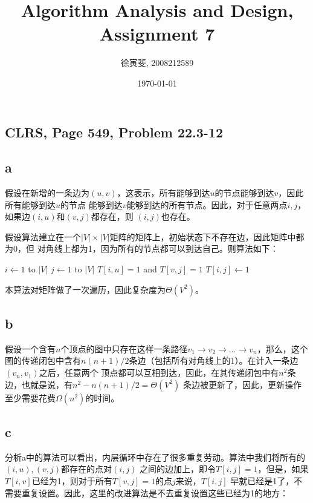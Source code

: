 \documentclass{article}
\begin{document}
\begin{CJK}{UTF8}{gbsn}
\title{Algorithm Analysis and Design, Assignment 7}
\author{徐寅斐, 2008212589}
\date{\today}

\maketitle

\section{CLRS, Page 549, Problem 22.3-12}

\subsection*{a}
假设在新增的一条边为$(u,v)$，这表示，所有能够到达$u$的节点能够到达$v$，因此所有能够到达$u$的节点
能够到达$v$能够到达的所有节点。因此，对于任意两点$i,j$，如果边$(i,u)$和$(v,j)$都存在，则
$(i,j)$也存在。

假设算法建立在一个$|V| \times |V| $矩阵的矩阵上，初始状态下不存在边，因此矩阵中都为0，但
对角线上都为1，因为所有的节点都可以到达自己。则算法如下：

\begin{codebox}
\li \For $i \gets 1$ to $|V|$
\li 	\Do \For $j \gets 1$ to $|V|$
\li 			\Do \If $T[i, u] = 1$ and $T[v, j] = 1$
\li						\Then $T[i, j] \gets 1$
						\End
				\End
		\End
\end{codebox}

本算法对矩阵做了一次遍历，因此复杂度为$\Theta(V^2)$。

\subsection*{b}
假设一个含有$n$个顶点的图中只存在这样一条路径$v_1 \to v_2 \to \ldots \to v_n$，那么，这个
图的传递闭包中含有$n(n+1)/2$条边（包括所有对角线上的1）。在计入一条边$(v_n, v_1)$之后，任意两个
顶点都可以互相到达，因此，在其传递闭包中有$n^2$条边，也就是说，有$n^2 - n(n+1)/2 = \Theta(V^2)$
条边被更新了，因此，更新操作至少需要花费$\Omega(n^2)$的时间。

\subsection*{c}
分析a中的算法可以看出，内层循环中存在了很多重复劳动。算法中我们将所有的$(i,u),(v,j)$都存在的点对$(i,j)$
之间的边加上，即令$T[i,j]=1$，但是，如果$T[i,v]$已经为1，则对于所有$T[v,j]=1$的点$j$来说，$T[i,j]$
早就已经是1了，不需要重复设置。因此，这里的改进算法是不去重复设置这些已经为1的地方：


\end{CJK}
\end{document}
